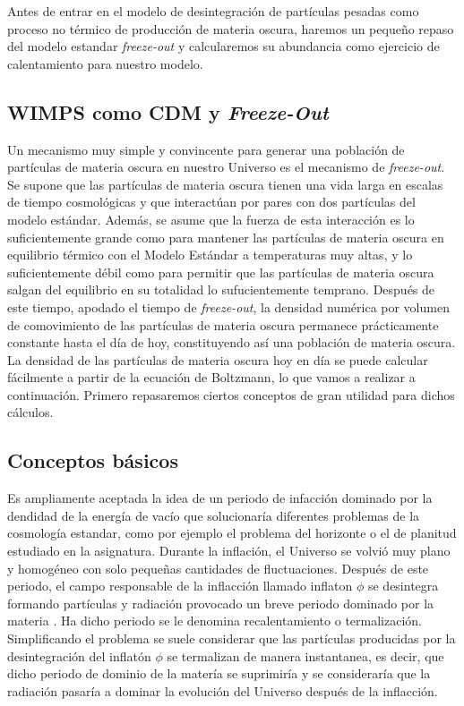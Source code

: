 \documentclass[11pt]{article}
\begin{document}
Antes de entrar en el modelo de desintegración de partículas pesadas como proceso no térmico de producción de materia oscura, haremos un pequeño repaso del modelo estandar \textit{freeze-out} y calcularemos su abundancia como ejercicio de calentamiento para nuestro modelo.
\subsection{WIMPS como CDM y \textit{Freeze-Out}}
Un mecanismo muy simple y convincente para generar una población de partículas de materia oscura en nuestro Universo es el mecanismo de \textit{freeze-out}. Se supone que las partículas de materia oscura tienen una vida larga en escalas de tiempo cosmológicas y que interactúan por pares con dos partículas del modelo estándar. Además, se asume que la fuerza de esta interacción es lo suficientemente grande como para mantener las partículas de materia oscura en equilibrio térmico con el Modelo Estándar a temperaturas muy altas, y lo suficientemente débil como para permitir que las partículas de materia oscura salgan del equilibrio en su totalidad lo sufucientemente temprano. Después de este tiempo, apodado el tiempo de \textit{freeze-out}, la densidad numérica por volumen de comovimiento de las partículas de materia oscura permanece prácticamente constante hasta el día de hoy, constituyendo así una población de materia oscura. La densidad de las partículas de materia oscura hoy en día se puede calcular fácilmente a partir de la ecuación de Boltzmann, lo que vamos a realizar a continuación. Primero repasaremos ciertos conceptos de gran utilidad para dichos cálculos.\\

\subsection{Conceptos básicos}
Es ampliamente aceptada la idea de un periodo de infacción dominado por la dendidad de la energía de vacío que solucionaría diferentes problemas de la cosmología estandar, como por ejemplo el problema del horizonte o el de planitud estudiado en la asignatura. Durante la inflación, el Universo se volvió muy plano y homogéneo con solo pequeñas cantidades de fluctuaciones. Después de este periodo, el campo responsable de la inflacción llamado inflaton $\phi$ se desintegra formando partículas y radiación provocado un breve periodo dominado por la materia \citep{baer2015dark}. Ha dicho periodo se le denomina recalentamiento o termalización. Simplificando el problema se suele considerar que las partículas producidas por la desintegración del inflatón $\phi$ se termalizan de manera instantanea, es decir, que dicho periodo de dominio de la matería se suprimiría y se consideraría que la radiación pasaría a dominar la evolución del Universo después de la inflacción.\\
\end{document}
